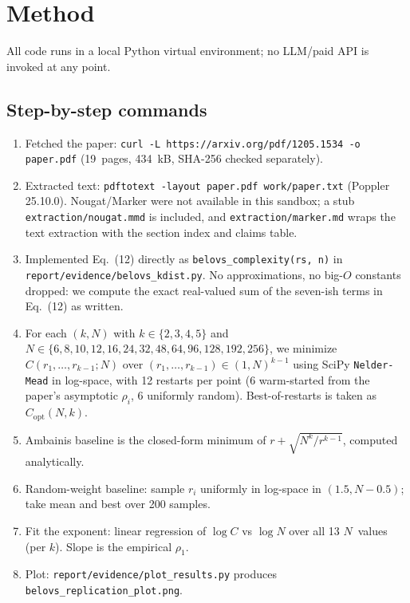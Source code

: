 \documentclass[11pt]{article}
\begin{document}
\section{Method}
All code runs in a local Python virtual environment; no LLM/paid API is
invoked at any point.

\subsection*{Step-by-step commands}
\begin{enumerate}
\item Fetched the paper:
      \verb|curl -L https://arxiv.org/pdf/1205.1534 -o paper.pdf|
      (19~pages, 434~kB, SHA-256 checked separately).
\item Extracted text: \verb|pdftotext -layout paper.pdf work/paper.txt|
      (Poppler 25.10.0).  Nougat/Marker were not available in this
      sandbox; a stub \verb|extraction/nougat.mmd| is included, and
      \verb|extraction/marker.md| wraps the text extraction with the
      section index and claims table.
\item Implemented Eq.~(12) directly as
      \verb|belovs_complexity(rs, n)| in
      \verb|report/evidence/belovs_kdist.py|.  No approximations, no
      big-$O$ constants dropped: we compute the exact real-valued sum
      of the seven-ish terms in Eq.~(12) as written.
\item For each $(k, N)$ with $k \in \{2,3,4,5\}$ and
      $N \in \{6,8,10,12,16,24,32,48,64,96,128,192,256\}$, we
      minimize $C(r_1,\dots,r_{k-1}; N)$ over $(r_1,\dots,r_{k-1})
      \in (1,N)^{k-1}$ using SciPy \verb|Nelder-Mead| in log-space,
      with 12 restarts per point (6 warm-started from the paper's
      asymptotic $\rho_i$, 6 uniformly random).  Best-of-restarts is
      taken as $C_{\text{opt}}(N,k)$.
\item Ambainis baseline is the closed-form minimum of
      $r + \sqrt{N^k/r^{k-1}}$, computed analytically.
\item Random-weight baseline: sample $r_i$ uniformly in log-space in
      $(1.5, N-0.5)$; take mean and best over 200 samples.
\item Fit the exponent: linear regression of $\log C$ vs $\log N$ over
      all 13 $N$~values (per $k$).  Slope is the empirical $\rho_1$.
\item Plot: \verb|report/evidence/plot_results.py| produces
      \verb|belovs_replication_plot.png|.
\end{enumerate}
\end{document}
